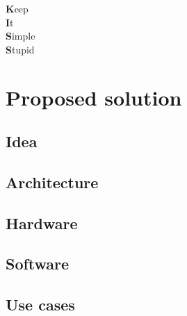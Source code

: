 
\begin{savequote}[70mm]
	\textbf{K}eep\\
	\textbf{I}t\\
	\textbf{S}imple\\
	\textbf{S}tupid\\
\end{savequote}

\chapter{Proposed solution}\label{chapter:proposed_solution}

\section{Idea}

\section{Architecture}


\section{Hardware}
%
%

\section{Software}



%

%
%

\section{Use cases}

